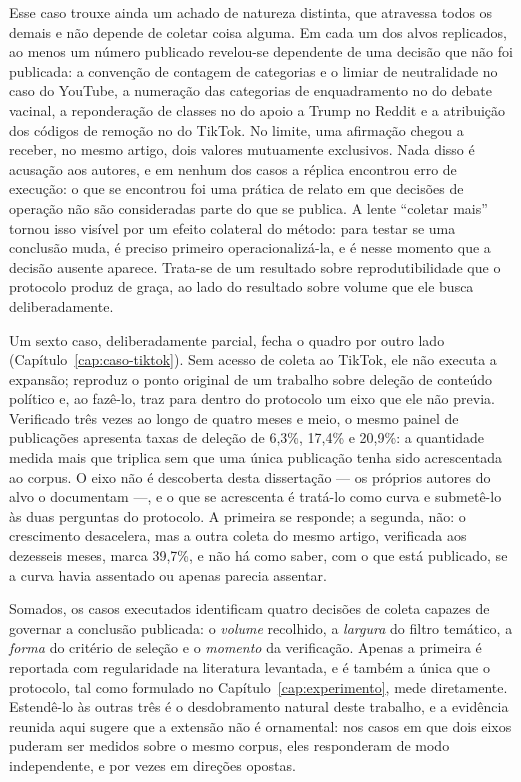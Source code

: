 Esse caso trouxe ainda um achado de natureza distinta, que atravessa todos os demais e
não depende de coletar coisa alguma. Em cada um dos alvos replicados, ao menos um número
publicado revelou-se dependente de uma decisão que não foi publicada: a convenção de
contagem de categorias e o limiar de neutralidade no caso do YouTube, a numeração
das categorias de enquadramento no do debate vacinal, a reponderação de classes no
do apoio a Trump no Reddit e a atribuição dos códigos de remoção no do TikTok. No
limite, uma afirmação chegou a receber, no mesmo artigo, dois valores mutuamente
exclusivos. Nada disso é acusação aos autores, e em nenhum dos casos a réplica
encontrou erro de execução: o que se encontrou foi uma prática de relato em que
decisões de operação não são consideradas parte do que se publica. A lente
``coletar mais'' tornou isso visível por um efeito colateral do método: para testar
se uma conclusão muda, é preciso primeiro operacionalizá-la, e é nesse momento que
a decisão ausente aparece. Trata-se de um resultado sobre reprodutibilidade que o
protocolo produz de graça, ao lado do resultado sobre volume que ele busca
deliberadamente.

Um sexto caso, deliberadamente parcial, fecha o quadro por outro lado
(Capítulo~\ref{cap:caso-tiktok}). Sem acesso de coleta ao TikTok, ele não executa a
expansão; reproduz o ponto original de um trabalho sobre deleção de conteúdo político
e, ao fazê-lo, traz para dentro do protocolo um eixo que ele não previa. Verificado
três vezes ao longo de quatro meses e meio, o mesmo painel de publicações apresenta
taxas de deleção de 6,3\%, 17,4\% e 20,9\%: a quantidade medida mais que triplica sem
que uma única publicação tenha sido acrescentada ao corpus. O eixo não é descoberta
desta dissertação --- os próprios autores do alvo o documentam ---, e o que se
acrescenta é tratá-lo como curva e submetê-lo às duas perguntas do protocolo. A
primeira se responde; a segunda, não: o crescimento desacelera, mas a outra coleta do
mesmo artigo, verificada aos dezesseis meses, marca 39,7\%, e não há como saber, com
o que está publicado, se a curva havia assentado ou apenas parecia assentar.

Somados, os casos executados identificam quatro decisões de coleta capazes de governar
a conclusão publicada: o \emph{volume} recolhido, a \emph{largura} do filtro temático,
a \emph{forma} do critério de seleção e o \emph{momento} da verificação. Apenas a
primeira é reportada com regularidade na literatura levantada, e é também a única que o
protocolo, tal como formulado no Capítulo~\ref{cap:experimento}, mede diretamente.
Estendê-lo às outras três é o desdobramento natural deste trabalho, e a evidência
reunida aqui sugere que a extensão não é ornamental: nos casos em que dois eixos
puderam ser medidos sobre o mesmo corpus, eles responderam de modo independente, e por
vezes em direções opostas.

